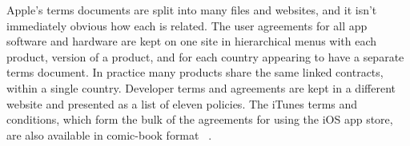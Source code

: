 \documentclass[thesis.tex]{subfiles}
\begin{document}
Apple's terms documents are split into many files and websites, and it isn't immediately obvious how each is related.
The user agreements for all app software and hardware are kept on one site in hierarchical menus with each product, version of a product, and for each country appearing to have a separate terms document.  In practice many products share the same linked contracts, within a single country.
Developer terms and agreements are kept in a different website and presented as a list of eleven policies.
The iTunes terms and conditions, which form the bulk of the agreements for using the iOS app store, are also available in comic-book format ~\cite{r._sikoryak_terms_2017}. 
\end{document}
